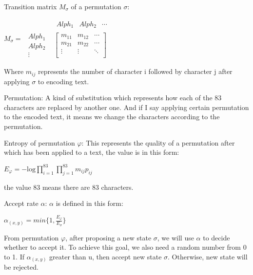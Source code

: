 \documentclass{acmtog} %
\begin{document}
\begin{myDef}
    Transition matrix ${M}_{\sigma }$ of a permutation ${\sigma }$:
    \begin{center}
        $M_{\sigma}=
        \begin{array}{lc}
    	\mbox{}&
    	\begin{array}{ccc}Alph_{1}&Alph_{2}&\cdots \end{array}\\
    	\begin{array}{c}Alph_{1}\\Alph_{2}\\ \vdots\end{array}&
    	\left[\begin{array}{ccc}
    		m_{11}  &  m_{12}  & \cdots\\
    		m_{21}  &  m_{22}  & \cdots\\
    		\vdots   & \vdots & \ddots  \\
    
    	\end{array}\right]
        \end{array}$
    \end{center}
    Where $m_{ij}$ represents the number of character i followed by character j after applying $\sigma$ to encoding text. 
\end{myDef}

\begin{myDef}
    Permutation: A kind of substitution which represents how each of the 83 characters are replaced by another one. And if I say applying certain permutation to the encoded text, it means we change the characters according to the permutation.
\end{myDef}
\begin{myDef}
    Entropy of permutation $\varphi$: This represents the quality of a permutation after which has been applied to a text, the value is in this form:
    \begin{center}
        ${E}_{\varphi }=-\mathrm{log}\prod _{i=1}^{83}\prod _{j=1}^{83}m_{ij}p_{ij}$
    \end{center}
    the value 83 means there are 83 characters.
\end{myDef}

\begin{myDef}
    Accept rate $\alpha$: $\alpha$ is defined in this form:
    \begin{center}
        ${\alpha }_{\left(x,y\right)}=min\{1,\frac{{E}_{\varphi }}{{E}_{\sigma }}\}$
    \end{center}
    From permutation ${\varphi }$, after proposing a new state ${\sigma }$, we will use $\alpha$ to decide whether to accept it. To achieve this goal, we also need a random number from 0 to 1. If ${\alpha }_{\left(x,y\right)}$ greater than u, then accept new state ${\sigma }$. Otherwise, new state will be rejected.
\end{myDef}
\end{document}
